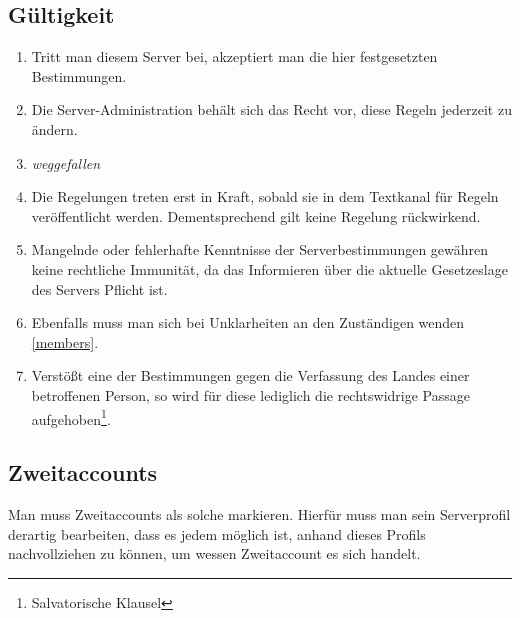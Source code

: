 \documentclass{article}
\begin{document}
\subsection{Gültigkeit}
\begin{enumerate}[(1)]
	\item Tritt man diesem Server bei, akzeptiert man die hier festgesetzten Bestimmungen.
	\item Die Server-Administration behält sich das Recht vor, diese Regeln jederzeit zu ändern.
	\item \textit{weggefallen}
	\item Die Regelungen treten erst in Kraft, sobald sie in dem Textkanal für Regeln veröffentlicht werden. Dementsprechend gilt keine Regelung rückwirkend.
	\item Mangelnde oder fehlerhafte Kenntnisse der Serverbestimmungen gewähren keine rechtliche Immunität, da das Informieren über die aktuelle Gesetzeslage des Servers Pflicht ist.
	\item Ebenfalls muss man sich bei Unklarheiten an den Zuständigen wenden \ref{members}.
	\item Verstößt eine der Bestimmungen gegen die Verfassung des Landes einer betroffenen Person, so wird für diese lediglich die rechtswidrige Passage aufgehoben\footnote{Salvatorische Klausel}.	
\end{enumerate}

\subsection{Zweitaccounts}
Man muss Zweitaccounts als solche markieren. Hierfür muss man sein Serverprofil derartig bearbeiten, dass es jedem möglich ist, anhand dieses Profils nachvollziehen zu können, um wessen Zweitaccount es sich handelt.
\end{document}
